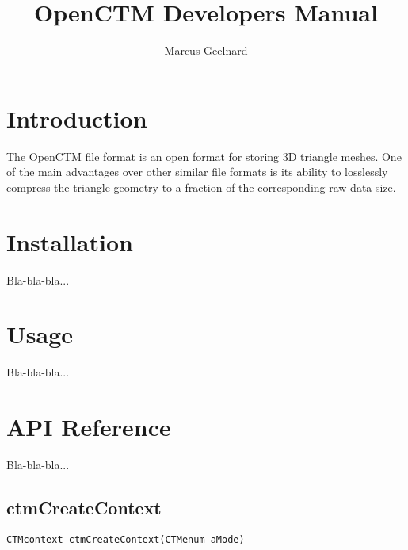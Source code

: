 

\author{Marcus Geelnard}
\title{OpenCTM Developers Manual}



\maketitle

\tableofcontents

\chapter{Introduction}
The OpenCTM file format is an open format for storing 3D triangle meshes.
One of the main advantages over other similar file formats is its ability
to losslessly compress the triangle geometry to a fraction of the corresponding
raw data size.

\chapter{Installation}
Bla-bla-bla...

\chapter{Usage}
Bla-bla-bla...

\chapter{API Reference}
Bla-bla-bla...

\section{ctmCreateContext}
\begin{lstlisting}
CTMcontext ctmCreateContext(CTMenum aMode)
\end{lstlisting}


